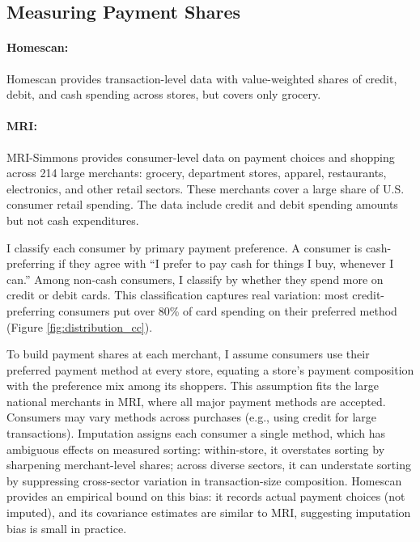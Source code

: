 \documentclass[main.tex]{subfiles}
\begin{document}
\subsection{Measuring Payment Shares}

\paragraph{Homescan: } Homescan provides transaction-level data with value-weighted shares of credit, debit, and cash spending across stores, but covers only grocery.

\paragraph{MRI: } MRI-Simmons provides consumer-level data on payment choices and shopping across 214 large merchants: grocery, department stores, apparel, restaurants, electronics, and other retail sectors.
These merchants cover a large share of U.S. consumer retail spending.
The data include credit and debit spending amounts but not cash expenditures.

I classify each consumer by primary payment preference.
A consumer is cash-preferring if they agree with ``I prefer to pay cash for things I buy, whenever I can.''
Among non-cash consumers, I classify by whether they spend more on credit or debit cards.
This classification captures real variation: most credit-preferring consumers put over 80\% of card spending on their preferred method (Figure \ref{fig:distribution_cc}).

To build payment shares at each merchant, I assume consumers use their preferred payment method at every store, equating a store's payment composition with the preference mix among its shoppers.
This assumption fits the large national merchants in MRI, where all major payment methods are accepted.
Consumers may vary methods across purchases (e.g., using credit for large transactions). Imputation assigns each consumer a single method, which has ambiguous effects on measured sorting: within-store, it overstates sorting by sharpening merchant-level shares; across diverse sectors, it can understate sorting by suppressing cross-sector variation in transaction-size composition.
Homescan provides an empirical bound on this bias: it records actual payment choices (not imputed), and its covariance estimates are similar to MRI, suggesting imputation bias is small in practice.
\end{document}
